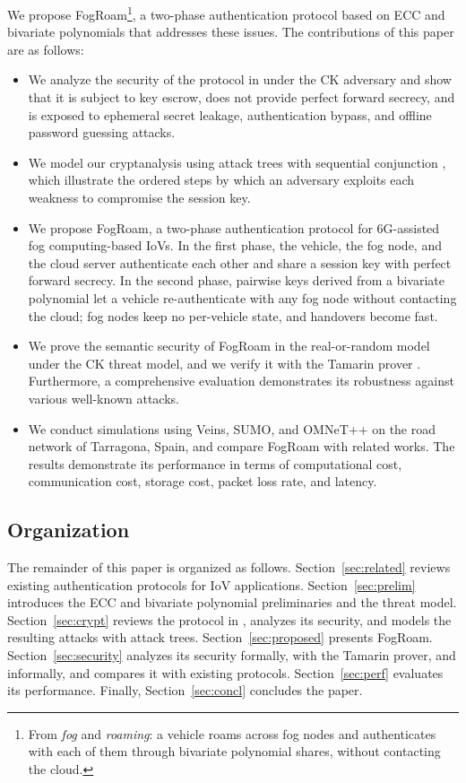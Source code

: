 \documentclass[journal]{IEEEtran}
\theoremstyle{plain}
\theoremstyle{definition}
\newcommand{\protocol}{\textsf{FogRoam}}   %
\begin{document}
We propose {\protocol}\footnote{From \emph{fog} and \emph{roaming}: a vehicle roams across fog nodes and authenticates with each of them through bivariate polynomial shares, without contacting the cloud.}, a two-phase authentication protocol based on ECC and bivariate polynomials that addresses these issues. The contributions of this paper are as follows:

\begin{itemize}
    \item We analyze the security of the protocol in \cite{chen2024provably} under the CK adversary and show that it is subject to key escrow, does not provide perfect forward secrecy, and is exposed to ephemeral secret leakage, authentication bypass, and offline password guessing attacks.

    \item We model our cryptanalysis using attack trees with sequential conjunction \cite{jhawar2015attack}, which illustrate the ordered steps by which an adversary exploits each weakness to compromise the session key.

    \item We propose {\protocol}, a two-phase authentication protocol for 6G-assisted fog computing-based IoVs. In the first phase, the vehicle, the fog node, and the cloud server authenticate each other and share a session key with perfect forward secrecy. In the second phase, pairwise keys derived from a bivariate polynomial let a vehicle re-authenticate with any fog node without contacting the cloud; fog nodes keep no per-vehicle state, and handovers become fast.

    \item We prove the semantic security of {\protocol} in the real-or-random model under the CK threat model, and we verify it with the Tamarin prover \cite{meier2013tamarin}. Furthermore, a comprehensive evaluation demonstrates its robustness against various well-known attacks.

    \item We conduct simulations using Veins, SUMO, and OMNeT++ on the road network of Tarragona, Spain, and compare {\protocol} with related works. The results demonstrate its performance in terms of computational cost, communication cost, storage cost, packet loss rate, and latency.
\end{itemize}

\subsection{Organization}
The remainder of this paper is organized as follows. Section~\ref{sec:related} reviews existing authentication protocols for IoV applications. Section~\ref{sec:prelim} introduces the ECC and bivariate polynomial preliminaries and the threat model. Section~\ref{sec:crypt} reviews the protocol in \cite{chen2024provably}, analyzes its security, and models the resulting attacks with attack trees. Section~\ref{sec:proposed} presents {\protocol}. Section~\ref{sec:security} analyzes its security formally, with the Tamarin prover, and informally, and compares it with existing protocols. Section~\ref{sec:perf} evaluates its performance. Finally, Section~\ref{sec:concl} concludes the paper.
\end{document}
